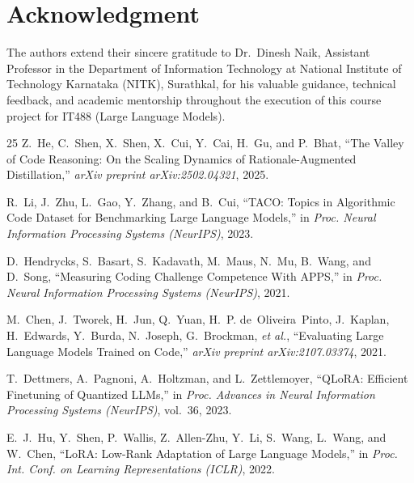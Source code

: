 \documentclass{ieeeaccess}
\begin{document}
\section*{Acknowledgment}
The authors extend their sincere gratitude to Dr.~Dinesh Naik, Assistant Professor in the Department of Information Technology at National Institute of Technology Karnataka (NITK), Surathkal, for his valuable guidance, technical feedback, and academic mentorship throughout the execution of this course project for IT488 (Large Language Models).

\begin{thebibliography}{25}
Z.~He, C.~Shen, X.~Shen, X.~Cui, Y.~Cai, H.~Gu, and P.~Bhat,
``The Valley of Code Reasoning: On the Scaling Dynamics of Rationale-Augmented Distillation,''
\textit{arXiv preprint arXiv:2502.04321}, 2025.

R.~Li, J.~Zhu, L.~Gao, Y.~Zhang, and B.~Cui,
``TACO: Topics in Algorithmic Code Dataset for Benchmarking Large Language Models,''
in \textit{Proc. Neural Information Processing Systems (NeurIPS)}, 2023.

D.~Hendrycks, S.~Basart, S.~Kadavath, M.~Maus, N.~Mu, B.~Wang, and D.~Song,
``Measuring Coding Challenge Competence With APPS,''
in \textit{Proc. Neural Information Processing Systems (NeurIPS)}, 2021.

M.~Chen, J.~Tworek, H.~Jun, Q.~Yuan, H.~P. de~Oliveira~Pinto, J.~Kaplan, H.~Edwards, Y.~Burda, N.~Joseph, G.~Brockman, \textit{et al.},
``Evaluating Large Language Models Trained on Code,''
\textit{arXiv preprint arXiv:2107.03374}, 2021.

T.~Dettmers, A.~Pagnoni, A.~Holtzman, and L.~Zettlemoyer,
``QLoRA: Efficient Finetuning of Quantized LLMs,''
in \textit{Proc. Advances in Neural Information Processing Systems (NeurIPS)}, vol.~36, 2023.

E.~J.~Hu, Y.~Shen, P.~Wallis, Z.~Allen-Zhu, Y.~Li, S.~Wang, L.~Wang, and W.~Chen,
``LoRA: Low-Rank Adaptation of Large Language Models,''
in \textit{Proc. Int. Conf. on Learning Representations (ICLR)}, 2022.


\end{thebibliography}
\end{document}
